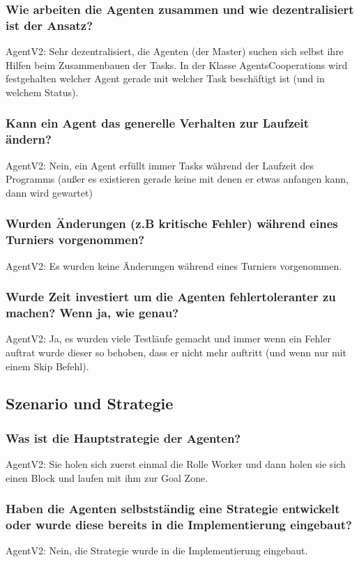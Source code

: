 \documentclass[runningheads]{llncs}
\begin{document}
\subsubsection{Wie arbeiten die Agenten zusammen und wie dezentralisiert ist der Ansatz?\\}
AgentV2: Sehr dezentralisiert, die Agenten (der Master) suchen sich selbst ihre Hilfen beim Zusammenbauen der Tasks. In der Klasse AgentsCooperations wird festgehalten welcher Agent gerade mit welcher Task beschäftigt ist (und in welchem Status).
\subsubsection{Kann ein Agent das generelle Verhalten zur Laufzeit ändern?\\}
AgentV2: Nein, ein Agent erfüllt immer Tasks während der Laufzeit des Programms (außer es existieren gerade keine mit denen er etwas anfangen kann, dann wird gewartet)
\subsubsection{Wurden Änderungen (z.B kritische Fehler) während eines Turniers vorgenommen?\\}
AgentV2: Es wurden keine Änderungen während eines Turniers vorgenommen.
\subsubsection{Wurde Zeit investiert um die Agenten fehlertoleranter zu machen? Wenn ja, wie genau?\\}
AgentV2: Ja, es wurden viele Testläufe gemacht und immer wenn ein Fehler auftrat wurde dieser so behoben, dass er nicht mehr auftritt (und wenn nur mit einem Skip Befehl).
\subsection{Szenario und Strategie}
\subsubsection{Was ist die Hauptstrategie der Agenten?\\}
AgentV2: Sie holen sich zuerst einmal die Rolle Worker und dann holen sie sich einen Block und laufen mit ihm zur Goal Zone.
\subsubsection{Haben die Agenten selbstständig eine Strategie entwickelt oder wurde diese bereits in die Implementierung eingebaut?\\}
AgentV2: Nein, die Strategie wurde in die Implementierung eingebaut.
\end{document}
